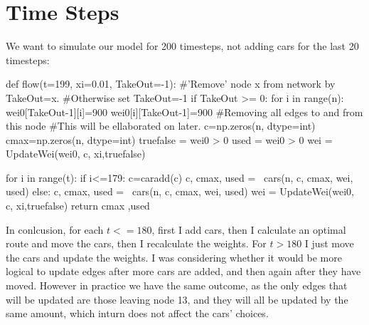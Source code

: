 \documentclass[paper=a4, fontsize=12pt]{scrartcl} %
\numberwithin{equation}{section}       %
\numberwithin{figure}{section}         %
\numberwithin{table}{section}          %
\begin{document}
\section{Time Steps}
We want to simulate our model for 200 timesteps, not adding cars for the last 20 timesteps:
\begin{python}
def flow(t=199, xi=0.01, TakeOut=-1):
#'Remove' node x from network by TakeOut=x. 
#Otherwise set TakeOut=-1
	if TakeOut >= 0:    
		for i in range(n):
			wei0[TakeOut-1][i]=900
			wei0[i][TakeOut-1]=900
		#Removing all edges to and from this node
		#This will be ellaborated on later.
	c=np.zeros(n, dtype=int)
	cmax=np.zeros(n, dtype=int)
	truefalse = wei0 > 0
	used = wei0 > 0
	wei = UpdateWei(wei0, c, xi,truefalse)
	
	for i in range(t):
		if i<=179:
			c=caradd(c)
			c, cmax, used = \
			cars(n, c, cmax, wei, used)
		else:
			c, cmax, used = \
			cars(n, c, cmax, wei, used)    
		wei = UpdateWei(wei0, c, xi,truefalse)
	return cmax ,used
\end{python}
In conlcusion, for each $t<=180$, first I add cars, then I  calculate an optimal route and move the cars, then I recalculate the weights. For $t>180$ I just move the cars and update the weights. I was considering whether it would be more logical to update edges after more cars are added, and then again after they have moved. However in practice we have the same outcome, as the only edges that will be updated are those leaving node 13, and they will all be updated by the same amount, which inturn does not affect the cars' choices. 
\end{document}

